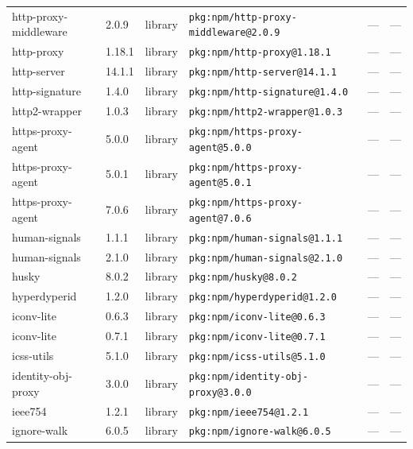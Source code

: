 \documentclass[11pt,a4paper]{article}
\begin{document}
\begin{longtable}{|p{4cm}|p{2cm}|p{1.6cm}|p{5cm}|p{1.5cm}|p{3.5cm}|}
\raggedright http-proxy-middleware & 2.0.9 & library & \small\texttt{pkg:npm/http-proxy-middleware@2.0.9} & — & \small — \\
\raggedright http-proxy & 1.18.1 & library & \small\texttt{pkg:npm/http-proxy@1.18.1} & — & \small — \\
\raggedright http-server & 14.1.1 & library & \small\texttt{pkg:npm/http-server@14.1.1} & — & \small — \\
\raggedright http-signature & 1.4.0 & library & \small\texttt{pkg:npm/http-signature@1.4.0} & — & \small — \\
\raggedright http2-wrapper & 1.0.3 & library & \small\texttt{pkg:npm/http2-wrapper@1.0.3} & — & \small — \\
\raggedright https-proxy-agent & 5.0.0 & library & \small\texttt{pkg:npm/https-proxy-agent@5.0.0} & — & \small — \\
\raggedright https-proxy-agent & 5.0.1 & library & \small\texttt{pkg:npm/https-proxy-agent@5.0.1} & — & \small — \\
\raggedright https-proxy-agent & 7.0.6 & library & \small\texttt{pkg:npm/https-proxy-agent@7.0.6} & — & \small — \\
\raggedright human-signals & 1.1.1 & library & \small\texttt{pkg:npm/human-signals@1.1.1} & — & \small — \\
\raggedright human-signals & 2.1.0 & library & \small\texttt{pkg:npm/human-signals@2.1.0} & — & \small — \\
\raggedright husky & 8.0.2 & library & \small\texttt{pkg:npm/husky@8.0.2} & — & \small — \\
\raggedright hyperdyperid & 1.2.0 & library & \small\texttt{pkg:npm/hyperdyperid@1.2.0} & — & \small — \\
\raggedright iconv-lite & 0.6.3 & library & \small\texttt{pkg:npm/iconv-lite@0.6.3} & — & \small — \\
\raggedright iconv-lite & 0.7.1 & library & \small\texttt{pkg:npm/iconv-lite@0.7.1} & — & \small — \\
\raggedright icss-utils & 5.1.0 & library & \small\texttt{pkg:npm/icss-utils@5.1.0} & — & \small — \\
\raggedright identity-obj-proxy & 3.0.0 & library & \small\texttt{pkg:npm/identity-obj-proxy@3.0.0} & — & \small — \\
\raggedright ieee754 & 1.2.1 & library & \small\texttt{pkg:npm/ieee754@1.2.1} & — & \small — \\
\raggedright ignore-walk & 6.0.5 & library & \small\texttt{pkg:npm/ignore-walk@6.0.5} & — & \small — \\

\end{longtable}
\end{document}

